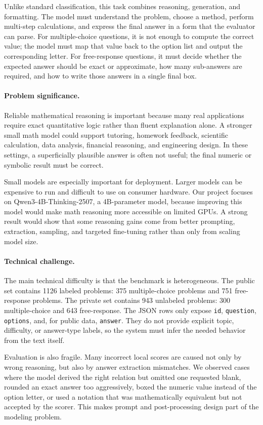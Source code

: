 \documentclass{article}
\newcommand{\model}{Qwen3-4B-Thinking-2507}
\begin{document}
Unlike standard classification, this task combines reasoning, generation, and formatting. The model must understand the problem, choose a method, perform multi-step calculations, and express the final answer in a form that the evaluator can parse. For multiple-choice questions, it is not enough to compute the correct value; the model must map that value back to the option list and output the corresponding letter. For free-response questions, it must decide whether the expected answer should be exact or approximate, how many sub-answers are required, and how to write those answers in a single final box.

\paragraph{Problem significance.}
Reliable mathematical reasoning is important because many real applications require exact quantitative logic rather than fluent explanation alone. A stronger small math model could support tutoring, homework feedback, scientific calculation, data analysis, financial reasoning, and engineering design. In these settings, a superficially plausible answer is often not useful; the final numeric or symbolic result must be correct.

Small models are especially important for deployment. Larger models can be expensive to run and difficult to use on consumer hardware. Our project focuses on \model, a 4B-parameter model, because improving this model would make math reasoning more accessible on limited GPUs. A strong result would show that some reasoning gains come from better prompting, extraction, sampling, and targeted fine-tuning rather than only from scaling model size.

\paragraph{Technical challenge.}
The main technical difficulty is that the benchmark is heterogeneous. The public set contains 1126 labeled problems: 375 multiple-choice problems and 751 free-response problems. The private set contains 943 unlabeled problems: 300 multiple-choice and 643 free-response. The JSON rows only expose \texttt{id}, \texttt{question}, \texttt{options}, and, for public data, \texttt{answer}. They do not provide explicit topic, difficulty, or answer-type labels, so the system must infer the needed behavior from the text itself.

Evaluation is also fragile. Many incorrect local scores are caused not only by wrong reasoning, but also by answer extraction mismatches. We observed cases where the model derived the right relation but omitted one requested blank, rounded an exact answer too aggressively, boxed the numeric value instead of the option letter, or used a notation that was mathematically equivalent but not accepted by the scorer. This makes prompt and post-processing design part of the modeling problem.
\end{document}
